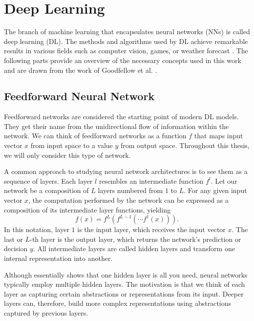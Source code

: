 \section{Deep Learning}\label{section:dl}

The branch of machine learning that encapsulates neural networks (NNs) is called deep learning (DL).
The methods and algorithms used by DL achieve remarkable results in various fields such as computer vision, games, or weather forecast \cite{alexnet, alphago, weather}. The following parts provide an overview of the necessary concepts used in this work and are drawn from the work of Goodfellow et al. \cite{goodfellow}.

\subsection*{Feedforward Neural Network}\label{feedforward-nn}

Feedforward networks are considered the starting point of modern DL models.
They get their name from the unidirectional flow of information within the network.
We can think of feedforward networks as a function $f$ that maps input vector $x$ from input space to a value $y$ from output space.
Throughout this thesis, we will only consider this type of network.

A common approach to studying neural network architectures is to see them as a sequence of layers.
Each layer $l$ resembles an intermediate function $f^l$.
Let our network be a composition of $L$ layers numbered from $1$ to $L$.
For any given input vector $x$, the computation performed by the network can be expressed as a composition of its intermediate layer functions, yielding
\begin{equation}
    f(x) = f^L(f^{L-1}(\cdots f^1(x))).
\end{equation}
In this notation, layer $1$ is the input layer, which receives the input vector $x$.
The last or $L$-th layer is the output layer, which returns the network's prediction or decision $y$.
All intermediate layers are called hidden layers and transform one internal representation into another.

Although \cite{cybenko} essentially shows that one hidden layer is all you need, neural networks typically employ multiple hidden layers.
The motivation is that we think of each layer as capturing certain abstractions or representations from its input.
Deeper layers can, therefore, build more complex representations using abstractions captured by previous layers.


